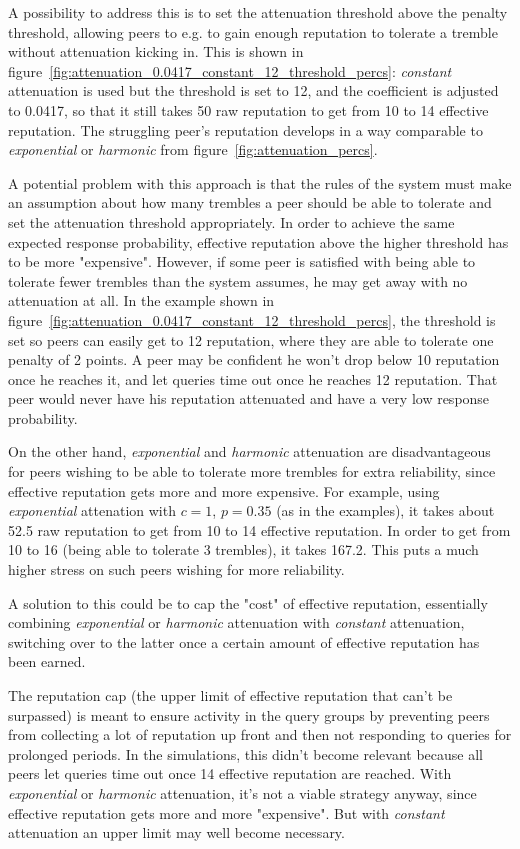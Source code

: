 A possibility to address this is to set the attenuation threshold above the
penalty threshold, allowing peers to e.g. to gain enough reputation to tolerate
a tremble without attenuation kicking in. This is shown in
figure~\ref{fig:attenuation_0.0417_constant_12_threshold_percs}: \emph{constant}
attenuation is used but the threshold is set to 12, and the coefficient is
adjusted to 0.0417, so that it still takes 50 raw reputation to get from 10 to
14 effective reputation. The struggling peer's reputation develops in a way
comparable to \emph{exponential} or \emph{harmonic} from
figure~\ref{fig:attenuation_percs}.

A potential problem with this approach is that the rules of the system must make
an assumption about how many trembles a peer should be able to tolerate and set
the attenuation threshold appropriately. In order to achieve the same expected
response probability, effective reputation above the higher threshold has to be
more "expensive". However, if some peer is satisfied with being able to tolerate
fewer trembles than the system assumes, he may get away with no attenuation at
all. In the example shown in
figure~\ref{fig:attenuation_0.0417_constant_12_threshold_percs}, the threshold
is set so peers can easily get to 12 reputation, where they are able to tolerate
one penalty of 2 points. A peer may be confident he won't drop below 10
reputation once he reaches it, and let queries time out once he reaches 12
reputation. That peer would never have his reputation attenuated and have a very
low response probability.

On the other hand, \emph{exponential} and \emph{harmonic} attenuation are
disadvantageous for peers wishing to be able to tolerate more trembles for extra
reliability, since effective reputation gets more and more expensive. For
example, using \emph{exponential} attenation with $c = 1$, $p = 0.35$ (as in the
examples), it takes about 52.5 raw reputation to get from 10 to 14 effective
reputation. In order to get from 10 to 16 (being able to tolerate 3 trembles),
it takes 167.2. This puts a much higher stress on such peers wishing for more
reliability.

A solution to this could be to cap the "cost" of effective reputation,
essentially combining \emph{exponential} or \emph{harmonic} attenuation with
\emph{constant} attenuation, switching over to the latter once a certain amount
of effective reputation has been earned.

The reputation cap (the upper limit of effective reputation that can't be
surpassed) is meant to ensure activity in the query groups by preventing peers
from collecting a lot of reputation up front and then not responding to queries
for prolonged periods. In the simulations, this didn't become relevant because
all peers let queries time out once 14 effective reputation are reached. With
\emph{exponential} or \emph{harmonic} attenuation, it's not a viable strategy
anyway, since effective reputation gets more and more "expensive". But with
\emph{constant} attenuation an upper limit may well become necessary.

